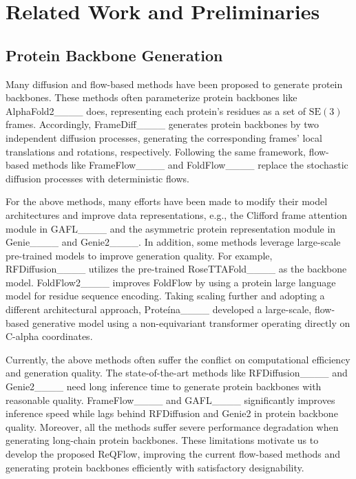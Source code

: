 \section{Related Work and Preliminaries}
\subsection{Protein Backbone Generation}
Many diffusion and flow-based methods have been proposed to generate protein backbones. 
These methods often parameterize protein backbones like AlphaFold2____ does, representing each protein's residues as a set of $\text{SE}(3)$ frames.
Accordingly, FrameDiff____ generates protein backbones by two independent diffusion processes, generating the corresponding frames' local translations and rotations, respectively.
Following the same framework, flow-based methods like FrameFlow____ and FoldFlow____ replace the stochastic diffusion processes with deterministic flows. 

For the above methods, many efforts have been made to modify their model architectures and improve data representations, e.g., the Clifford frame attention module in GAFL____ and the asymmetric protein representation module in Genie____ and Genie2____. 
In addition, some methods leverage large-scale pre-trained models to improve generation quality.
For example, RFDiffusion____ utilizes the pre-trained RoseTTAFold____ as the backbone model.
FoldFlow2____ improves FoldFlow by using a protein large language model for residue sequence encoding. Taking scaling further and adopting a different architectural approach, Prote\'{i}na____ developed a large-scale, flow-based generative model using a non-equivariant transformer operating directly on C-alpha coordinates.

Currently, the above methods often suffer the conflict on computational efficiency and generation quality.
The state-of-the-art methods like RFDiffusion____ and Genie2____ need long inference time to generate protein backbones with reasonable quality.
FrameFlow____ and GAFL____ significantly improves inference speed while lags behind RFDiffusion and Genie2 in protein backbone quality. 
Moreover, all the methods suffer severe performance degradation when generating long-chain protein backbones. 
These limitations motivate us to develop the proposed ReQFlow, improving the current flow-based methods and generating protein backbones efficiently with satisfactory designability.





